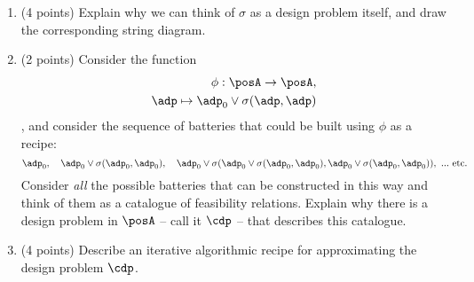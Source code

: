 \documentclass[paper=8.125in:10.250in,pagesize=pdftex,
    headinclude=false,footinclude=false,oneside,egregdoesnotlikesansseriftitles]{kaobook}
\begin{document}
\begin{gradedexercise}
\begin{enumerate}
\item (4 points) Explain why we can think of $\sigma$ as a design problem itself, and draw the corresponding string diagram. 
\item (2 points)  Consider the function 
\begin{eqnarray}
    \phi : \posA \to \posA, \\ \adp \mapsto \adp_0 \vee \sigma(\adp,\adp)
\end{eqnarray}, and consider the sequence of batteries that could be built using $\phi$ as a recipe: 
$$
\adp_0, \quad \adp_0 \vee \sigma(\adp_0,\adp_0), \quad \adp_0 \vee \sigma(\adp_0 \vee \sigma(\adp_0,\adp_0), \adp_0 \vee \sigma(\adp_0,\adp_0)), \ ... \  \text{etc.}
$$
Consider \emph{all} the possible batteries that can be constructed in this way and think of them as a catalogue of feasibility relations. 
Explain why there is a design problem in $\posA$ -- call it $\cdp$ -- that describes this catalogue.
\item (4 points) Describe an iterative algorithmic recipe for approximating the design problem $\cdp$. 
\end{enumerate}

\end{gradedexercise}


\clearpage
\end{document}
